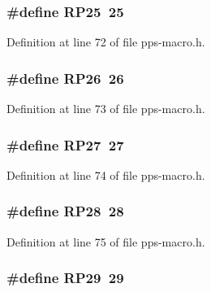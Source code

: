 \subsubsection[{R\+P25}]{\setlength{\rightskip}{0pt plus 5cm}\#define R\+P25~25}\label{pps-macro_8h_a987c8aaf43771fcf5d1fbce4fef5837f}


Definition at line 72 of file pps-\/macro.\+h.

\hypertarget{pps-macro_8h_aea9372b3a72b31ea4f087c6a1d68ff83}{}
\subsubsection[{R\+P26}]{\setlength{\rightskip}{0pt plus 5cm}\#define R\+P26~26}\label{pps-macro_8h_aea9372b3a72b31ea4f087c6a1d68ff83}


Definition at line 73 of file pps-\/macro.\+h.

\hypertarget{pps-macro_8h_a9a3c4429af307d0e571da8eb34f6f655}{}
\subsubsection[{R\+P27}]{\setlength{\rightskip}{0pt plus 5cm}\#define R\+P27~27}\label{pps-macro_8h_a9a3c4429af307d0e571da8eb34f6f655}


Definition at line 74 of file pps-\/macro.\+h.

\hypertarget{pps-macro_8h_a464fc61d76b28db11969410e286a6ce5}{}
\subsubsection[{R\+P28}]{\setlength{\rightskip}{0pt plus 5cm}\#define R\+P28~28}\label{pps-macro_8h_a464fc61d76b28db11969410e286a6ce5}


Definition at line 75 of file pps-\/macro.\+h.

\hypertarget{pps-macro_8h_aabaecad6bd37ac5b78a1fb87f8f50dce}{}
\subsubsection[{R\+P29}]{\setlength{\rightskip}{0pt plus 5cm}\#define R\+P29~29}\label{pps-macro_8h_aabaecad6bd37ac5b78a1fb87f8f50dce}



